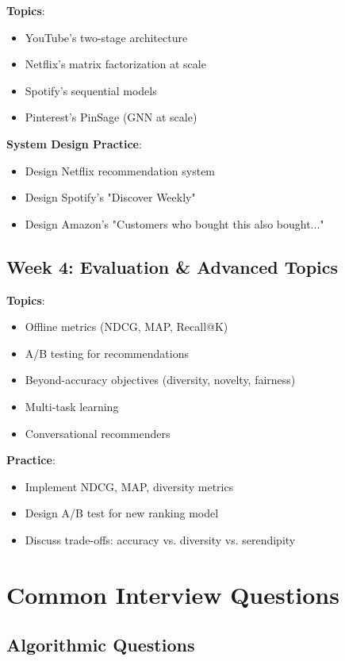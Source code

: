 \documentclass[10pt]{article}
\begin{document}
\textbf{Topics}:
\begin{itemize}[leftmargin=*]
    \item YouTube's two-stage architecture
    \item Netflix's matrix factorization at scale
    \item Spotify's sequential models
    \item Pinterest's PinSage (GNN at scale)
\end{itemize}

\textbf{System Design Practice}:
\begin{itemize}[leftmargin=*]
    \item Design Netflix recommendation system
    \item Design Spotify's "Discover Weekly"
    \item Design Amazon's "Customers who bought this also bought..."
\end{itemize}

\subsection{Week 4: Evaluation \& Advanced Topics}

\textbf{Topics}:
\begin{itemize}[leftmargin=*]
    \item Offline metrics (NDCG, MAP, Recall@K)
    \item A/B testing for recommendations
    \item Beyond-accuracy objectives (diversity, novelty, fairness)
    \item Multi-task learning
    \item Conversational recommenders
\end{itemize}

\textbf{Practice}:
\begin{itemize}[leftmargin=*]
    \item Implement NDCG, MAP, diversity metrics
    \item Design A/B test for new ranking model
    \item Discuss trade-offs: accuracy vs. diversity vs. serendipity
\end{itemize}

\section{Common Interview Questions}

\subsection{Algorithmic Questions}
\end{document}
